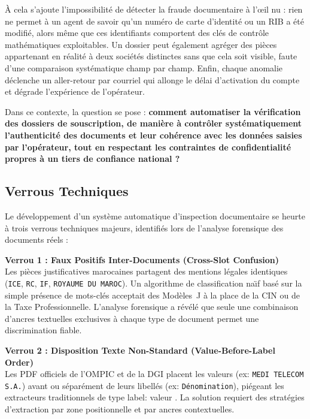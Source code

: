 À cela s'ajoute l'impossibilité de détecter la fraude documentaire à l'\oe il nu :
rien ne permet à un agent de savoir qu'un numéro de carte d'identité ou un RIB a
été modifié, alors même que ces identifiants comportent des clés de contrôle
mathématiques exploitables. Un dossier peut également agréger des pièces
appartenant en réalité à deux sociétés distinctes sans que cela soit visible,
faute d'une comparaison systématique champ par champ. Enfin, chaque anomalie
déclenche un aller-retour par courriel qui allonge le délai d'activation du compte
et dégrade l'expérience de l'opérateur.

Dans ce contexte, la question se pose : \textbf{comment automatiser la
vérification des dossiers de souscription, de manière à contrôler systématiquement
l'authenticité des documents et leur cohérence avec les données saisies par
l'opérateur, tout en respectant les contraintes de confidentialité propres à un
tiers de confiance national ?}
\subsection{ Verrous Techniques} 
Le d\'{e}veloppement d'un syst\`{e}me automatique d'inspection documentaire se heurte \`{a} trois verrous techniques majeurs, identifi\'{e}s lors de l'analyse forensique des documents r\'{e}els :

\begin{infobox}
\textbf{Verrou 1 : Faux Positifs Inter-Documents (Cross-Slot Confusion)} \\
Les pi\`{e}ces justificatives marocaines partagent des mentions l\'{e}gales identiques (\texttt{ICE}, \texttt{RC}, \texttt{IF}, \texttt{ROYAUME DU MAROC}). Un algorithme de classification na\"{\i}f bas\'{e} sur la simple pr\'{e}sence de mots-cl\'{e}s acceptait des Mod\`{e}les~J \`{a} la place de la CIN ou de la Taxe Professionnelle. L'analyse forensique a r\'{e}v\'{e}l\'{e} que seule une combinaison d'ancres textuelles exclusives \`{a} chaque type de document permet une discrimination fiable.
\end{infobox}

\begin{infobox}
\textbf{Verrou 2 : Disposition Texte Non-Standard (Value-Before-Label Order)} \\
Les PDF officiels de l'OMPIC et de la DGI placent les valeurs (ex: \texttt{MEDI TELECOM S.A.}) avant ou s\'{e}par\'{e}ment de leurs libell\'{e}s (ex: \texttt{D\'{e}nomination}), pi\'{e}geant les extracteurs traditionnels de type \og label: valeur \fg{}. La solution requiert des strat\'{e}gies d'extraction par zone positionnelle et par ancres contextuelles.
\end{infobox}

